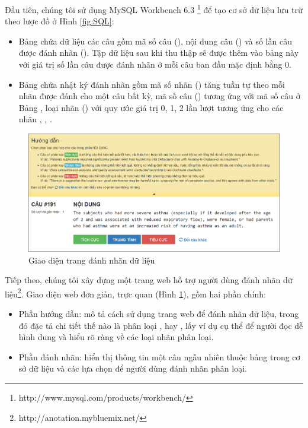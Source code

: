 Đầu tiên, chúng tôi sử dụng MySQL Workbench 6.3 \footnote{http://www.mysql.com/products/workbench/} để tạo cơ sở dữ liệu lưu trữ theo lược đồ ở Hình \ref{fig:SQL}:
\begin{itemize}
\item Bảng  chứa dữ liệu các câu gồm mã số câu (), nội dung câu () và số lần câu được đánh nhãn (). Tập dữ liệu sau khi thu thập sẽ được thêm vào bảng này với giá trị số lần câu được đánh nhãn ở mỗi câu ban đầu mặc định bằng 0.
\item Bảng  chứa nhật ký đánh nhãn gồm mã số nhãn () tăng tuần tự theo mỗi nhãn được đánh cho một câu bất kỳ, mã số câu () tương ứng với mã số câu ở Bảng , loại nhãn () với quy ước giá trị 0, 1, 2 lần lượt tương ứng cho các nhãn \tieucuc, \trungtinh, \tichcuc.
\end{itemize}

\begin{figure}[H]
\centering
\includegraphics[scale=0.45]{../hinh/Webpage.png}
\caption{Giao diện trang đánh nhãn dữ liệu}
\label{fig:web}
\end{figure}

Tiếp theo, chúng tôi xây dựng một trang web hỗ trợ người dùng đánh nhãn dữ liệu\footnote{http://anotation.mybluemix.net/}. Giao diện web đơn giản, trực quan (Hình \ref{fig:web}), gồm hai phần chính:
\begin{itemize}
\item Phần hướng dẫn: mô tả cách sử dụng trang web để đánh nhãn dữ liệu, trong đó đặc tả chi tiết thế nào là phân loại \tichcuc, \tieucuc hay \trungtinh, lấy ví dụ cụ thể để người đọc dễ hình dung và hiểu rõ ràng về các loại nhãn phân loại.
\item Phần đánh nhãn: hiển thị thông tin một câu ngẫu nhiên thuộc bảng  trong cơ sở dữ liệu và các lựa chọn để người dùng đánh nhãn phân loại. 
\end{itemize}

